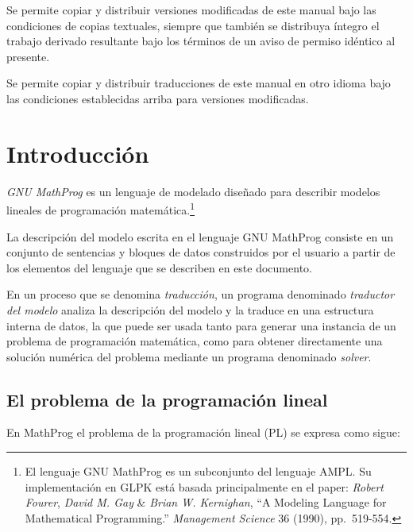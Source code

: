 \documentclass[11pt,spanish]{report}
\begin{document}
\noindent
Se permite copiar y distribuir versiones modificadas de este manual bajo las condiciones de copias textuales, siempre que también se distribuya íntegro el trabajo derivado resultante bajo los términos de un aviso de permiso idéntico al presente.

\noindent
Se permite copiar y distribuir traducciones de este manual en otro idioma bajo las condiciones establecidas arriba para versiones modificadas.


\newpage

{\setlength{\parskip}{0pt}
\tableofcontents
}


\chapter{Introducción}

{\it GNU MathProg} es un lenguaje de modelado diseñado para describir modelos lineales de programación matemática.\footnote{El lenguaje GNU MathProg es un subconjunto del lenguaje AMPL. Su implementación en GLPK está basada principalmente en el paper: {\it Robert Fourer}, {\it David M. Gay} \& {\it Brian W. Kernighan}, ``A Modeling Language for Mathematical Programming.'' {\it Management Science} 36 (1990), pp.~519-554.}

La descripción del modelo escrita en el lenguaje GNU MathProg consiste en un conjunto de sentencias y bloques de datos construidos por el usuario a partir de los elementos del lenguaje que se describen en este documento.

En un proceso que se denomina {\it traducción}, un programa denominado {\it traductor del modelo} analiza la descripción del modelo y la traduce en una estructura interna de datos, la que puede ser usada tanto para generar una instancia de un problema de programación matemática, como para obtener directamente una solución numérica del problema mediante un programa denominado {\it solver}.

\section{El problema de la programación lineal}
\label{problem}

En MathProg el problema de la programación lineal (PL) se expresa como sigue:
\end{document}
